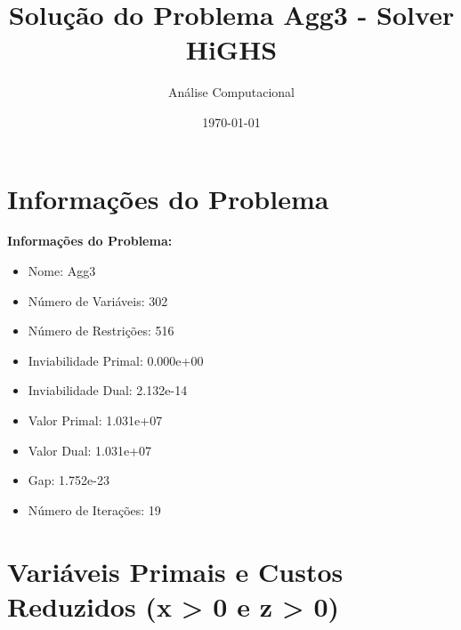 \documentclass[12pt]{article}
\title{Solução do Problema Agg3 - Solver HiGHS}
\author{Análise Computacional}
\date{\today}
\begin{document}
\maketitle

\section{Informações do Problema}

\textbf{Informações do Problema:}
\begin{itemize}
\item Nome: Agg3
\item Número de Variáveis: 302
\item Número de Restrições: 516
\item Inviabilidade Primal: 0.000e+00
\item Inviabilidade Dual: 2.132e-14
\item Valor Primal: 1.031e+07
\item Valor Dual: 1.031e+07
\item Gap: 1.752e-23
\item Número de Iterações: 19
\end{itemize}


\section{Variáveis Primais e Custos Reduzidos (x > 0 e z > 0)}
\end{document}
